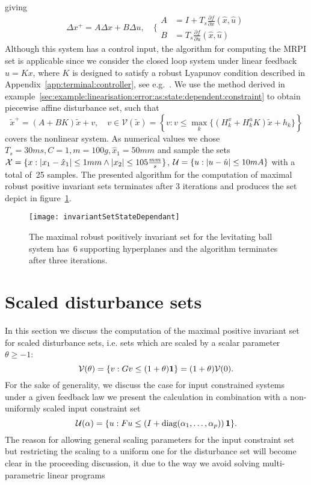 giving
%
\[
\Delta x^+ = A \Delta x + B \Delta u , \quad
\Biggl\{\begin{aligned} A &= I+T_s\frac{\partial f}{\partial  x}(\hat
  x,\hat u) \\
B &= T_s \frac{\partial f}{\partial u}(\hat x,\hat u)
\end{aligned}
\]
%
Although this system has a control input, the algorithm for computing the MRPI set is applicable since we consider 
the closed loop system under linear feedback  $u=Kx$, where $K$ is designed to satisfy a robust Lyapunov condition 
described in Appendix~\ref{app:terminal:controller}, see e.g.~\cite{Boyd:94}.
%
We use the method derived in example~\ref{sec:example:linearisation:error:as:state:dependent:constraint} to 
obtain piecewise affine disturbance set, such that
%
\begin{equation}
	\tilde x^+ = (A+ BK)\tilde x + v,\quad v\in\mathcal V(\tilde x) = \left\{v:v\leq\max_{k} 
	\{(H_k^x + H_k^u K) \tilde x+ h_k\}
	\right\}
\end{equation}
%
covers the nonlinear system.
%
As numerical values we chose $T_s=30ms, C=1, m=100g, \hat x_1 = 50mm$ and sample
the sets $\mathcal X=\{x:\left|x_1- \hat x_1\right|\leq 1mm\wedge \left|x_2\right|\leq 105\frac{mm}{s}\}$, 
$\mathcal U=\{u:\left| u-\hat u\right|\leq10mA\}$ with a total of~25 samples.
%
The presented algorithm for the computation of maximal robust positive invariant sets 
terminates after 3 iterations and produces the set depict in figure~\ref{fig:MRPI:set:levitating:ball}.
%
\begin{figure}
\centering
\texttt{[image: invariantSetStateDependant]}
\caption{The maximal robust positively invariant set for the levitating ball system
has~6 supporting hyperplanes and the algorithm terminates after three iterations.}
\label{fig:MRPI:set:levitating:ball}
\end{figure}
%
%
%
%
%
\section{Scaled disturbance sets}\label{sec:scaled:disturbance:sets}
In this section we discuss the computation of the maximal positive invariant set for scaled disturbance
sets, i.e. sets which are scaled by a scalar parameter~$\theta\geq-1$:
%
\begin{equation}
\mathcal V(\theta) = \{v: Gv\leq(1+\theta){\bf{1}}\}
= (1+\theta)\mathcal V(0).
\end{equation}
%
For the sake of generality, we discuss the case for input constrained systems under a given feedback law
we present the calculation in combination with a non-uniformly scaled input constraint set
%
\begin{equation}
\mathcal U({\bf{\alpha}}) = \{u: Fu\leq\left(I+\text{diag}(\alpha_1,\dots,\alpha_p)\right){\bf{1}}\}.
\end{equation}
%
The reason for allowing general scaling parameters for the input constraint set but restricting the scaling
to a uniform one for the disturbance set will become clear in the proceeding discussion, it due to the
way we avoid solving multi-parametric linear programs 

